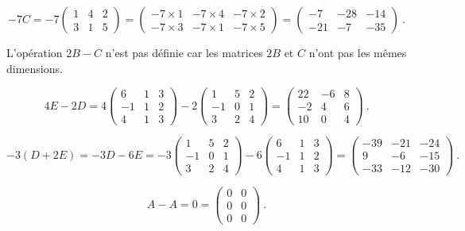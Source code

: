 {
\[
-7C = -7\begin{pmatrix} 1 & 4 & 2 \\ 3 & 1 & 5 \end{pmatrix}
= \begin{pmatrix}
-7\times 1 & -7\times 4 & -7\times 2 \\
-7\times 3 & -7\times 1 & -7\times 5
\end{pmatrix}
= \begin{pmatrix} -7 & -28 & -14 \\ -21 & -7 & -35 \end{pmatrix} \ .
\]

 L'opération $2B - C$ n'est pas définie car les matrices $2B$
et $C$ n'ont pas les mêmes dimensions.

\[
4E-2D = 
4\begin{pmatrix} 6 & 1 & 3 \\ -1 & 1 & 2 \\ 4 & 1 & 3 \end{pmatrix}
-2 \begin{pmatrix} 1 & 5 & 2 \\ -1 & 0 & 1 \\ 3 & 2 & 4 \end{pmatrix}
=\begin{pmatrix} 22 & -6 & 8 \\ -2 & 4 & 6 \\ 10 & 0 & 4 \end{pmatrix} \ .
\]

\[
-3(D+2E) = -3D - 6E
= -3\begin{pmatrix} 1 & 5 & 2 \\ -1 & 0 & 1 \\ 3 & 2 & 4 \end{pmatrix}  
-6 \begin{pmatrix} 6 & 1 & 3 \\ -1 & 1 & 2 \\ 4 & 1 & 3 \end{pmatrix}
= \begin{pmatrix}
-39 & -21 & -24 \\
9 & -6 & -15 \\
-33 & -12 & -30
\end{pmatrix} \ .
\]

\[ A-A = 0 = \begin{pmatrix} 0 & 0 \\ 0 & 0 \\ 0 & 0 \end{pmatrix} \ . \]

}
